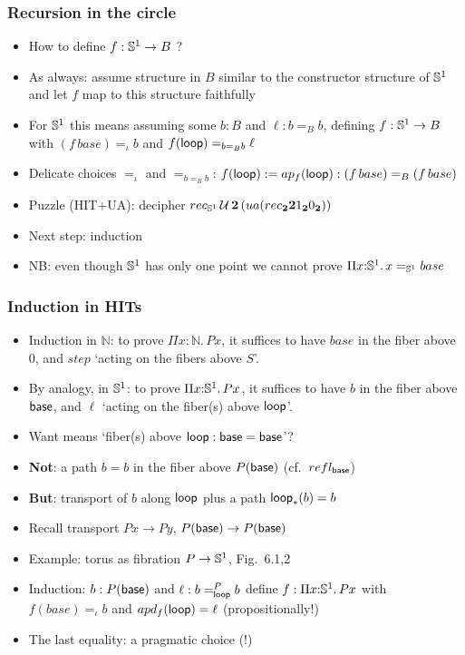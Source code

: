 \documentclass[handout]{beamer}
\newcommand{\depi}[3]{\Pi{#1{:}#2.\,#3}}
\newcommand{\Nat}{\mathbb{N}}
\newcommand{\UU}{{\cal U}}
\newcommand{\bftwo}{\mathbf{2}}
\begin{document}
\frame
  {
    \frametitle{Recursion in the circle}

    \begin{itemize}[<+->]
    \item How to define $f: {\mathbb{S}^1}\to{B}$ ?
    \item As always: assume structure in $B$ similar to the constructor structure
    of ${\mathbb{S}^1}$ and let $f$ map to this structure faithfully
    \item For ${\mathbb{S}^1}$ this means assuming some $b:B$ and $\ell: b =_B b$,
    defining $f:{\mathbb{S}^1}\to{B}$  with $(f\,base) =_\iota b$ and $f(\mathsf{loop}) =_{b =_B b} \ell$
    \item Delicate choices $=_\iota$ and $=_{b =_B b}$:  
    $f(\mathsf{loop}) := ap_f(\mathsf{loop}): (f\,base) =_B (f\,base)$
    \item Puzzle (HIT+UA): decipher 
    $rec_{\Sn^1}\, \UU\, \bftwo\, (ua(rec_{\bftwo}\bftwo 1_{\bftwo} 0_{\bftwo}))$
    \item Next step: induction
    \item NB: even though ${\mathbb{S}^1}$ has only one point
    we cannot prove $\depi{x}{\Sn^1}{x=_{\Sn^1}base}$
    \end{itemize}
  }
   
 \frame
  {
    \frametitle{Induction in HITs}

    \begin{itemize}[<+->]
    \item Induction in $\Nat$:  to prove $\depi{x}{\Nat}{Px}$, it suffices
    to have $base$ in the fiber above $0$, and $step$ `acting on the fibers above $S$'.
    \item By analogy, in $\mathbb{S}^1$:  to prove $\depi{x}{\Sn^1}{Px}$, it suffices
    to have $b$ in the fiber above $\mathsf{base}$, and $\ell$ `acting on the fiber(s) above $\mathsf{loop}$'.   
    \item Want means `fiber(s) above $\mathsf{loop}: \mathsf{base} = \mathsf{base}$'?
    \item {\bf Not}: a path $b=b$ in the fiber above $P(\mathsf{base})$  (cf.\ $refl_{\mathsf{base}}$)
    \item {\bf But}: transport of $b$ along $\mathsf{loop}$ plus a path $\mathsf{loop}_*(b)=b$
    \item Recall transport $Px \to Py$, $P(\mathsf{base})\to P(\mathsf{base})$
    \item Example: torus as fibration $P\to\mathbb{S}^1$, Fig.\ 6.1,2
    \item Induction: $b: P(\mathsf{base})$ and $\ell: b =^P_{\mathsf{loop}} b$ define $f:\depi{x}{\Sn^1}{Px}$
             with $f(base) =_\iota b$ and $apd_f(\mathsf{loop}) = \ell$ (propositionally!)
    \item The last equality: a pragmatic choice (!)
    \end{itemize}
  }
   
\end{document}
